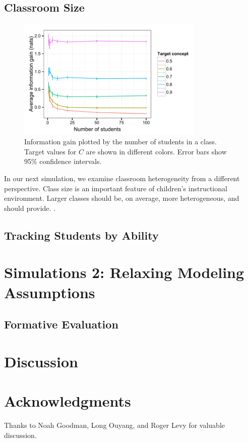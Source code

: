 \documentclass[10pt,letterpaper]{article}
\begin{document}
\subsection{Classroom Size}

\begin{figure}[t]
\begin{center}
\includegraphics[width=3.5in]{figures/class_size.pdf}
\end{center}
\caption{\label{fig:class} Information gain plotted by the number of students in a class. Target values for $C$ are shown in different colors. Error bars show 95\% confidence intervals.}
\end{figure}

In our next simulation, we examine classroom heterogeneity from a different perspective. Class size is an important feature of children's instructional environment. Larger classes should be, on average, more heterogeneous, and should provide. \cite{glass1979}.


\subsection{Tracking Students by Ability}

\section{Simulations 2: Relaxing Modeling Assumptions}

\subsection{Formative Evaluation}


\section{Discussion}


\section{Acknowledgments}

Thanks to Noah Goodman, Long Ouyang, and Roger Levy for valuable discussion.



\setlength{\bibleftmargin}{.125in}
\setlength{\bibindent}{-\bibleftmargin}


\end{document}
